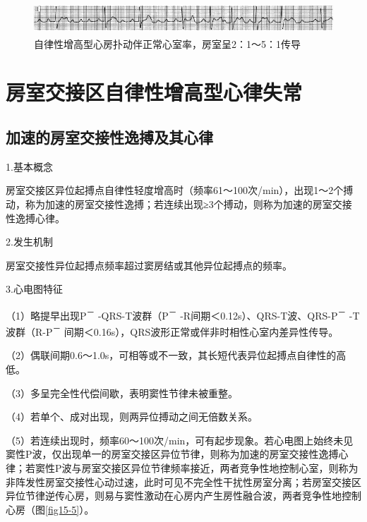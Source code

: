 \begin{figure}[!htbp]
 \centering
 \includegraphics[width=5.58333in,height=0.46875in]{./images/Image00270.jpg}
 \captionsetup{justification=centering}
 \caption{自律性增高型心房扑动伴正常心室率，房室呈2：1～5：1传导}
 \label{fig15-4}
  \end{figure} 

\protect\hypertarget{text00022.htmlux5cux23subid267}{}{}

\section{房室交接区自律性增高型心律失常}

\protect\hypertarget{text00022.htmlux5cux23subid268}{}{}

\subsection{加速的房室交接性逸搏及其心律}

1.基本概念

房室交接区异位起搏点自律性轻度增高时（频率61～100次/min），出现1～2个搏动，称为加速的房室交接性逸搏；若连续出现≥3个搏动，则称为加速的房室交接性逸搏心律。

2.发生机制

房室交接性异位起搏点频率超过窦房结或其他异位起搏点的频率。

3.心电图特征

（1）略提早出现P\textsuperscript{－} -QRS-T波群（P\textsuperscript{－}
-R间期＜0.12s）、QRS-T波、QRS-P\textsuperscript{－}
-T波群（R-P\textsuperscript{－}
间期＜0.16s），QRS波形正常或伴非时相性心室内差异性传导。

（2）偶联间期0.6～1.0s，可相等或不一致，其长短代表异位起搏点自律性的高低。

（3）多呈完全性代偿间歇，表明窦性节律未被重整。

（4）若单个、成对出现，则两异位搏动之间无倍数关系。

（5）若连续出现时，频率60～100次/min，可有起步现象。若心电图上始终未见窦性P波，仅出现单一的房室交接区异位节律，则称为加速的房室交接性逸搏心律；若窦性P波与房室交接区异位节律频率接近，两者竞争性地控制心室，则称为非阵发性房室交接性心动过速，此时可见不完全性干扰性房室分离；若房室交接区异位节律逆传心房，则易与窦性激动在心房内产生房性融合波，两者竞争性地控制心房（图\ref{fig15-5}）。

